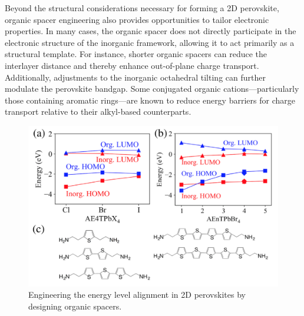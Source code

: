 Beyond the structural considerations necessary for forming a 2D perovskite, organic spacer engineering also provides opportunities to tailor electronic properties. In many cases, the organic spacer does not directly participate in the electronic structure of the inorganic framework, allowing it to act primarily as a structural template. For instance, shorter organic spacers can reduce the interlayer distance and thereby enhance out-of-plane charge transport\cite{RN179}. Additionally, adjustments to the inorganic octahedral tilting can further modulate the perovskite bandgap\cite{RN31}. Some conjugated organic cations—particularly those containing aromatic rings—are known to reduce energy barriers for charge transport relative to their alkyl-based counterparts\cite{RN239,RN88}.

\begin{figure}[ht]
    \centering
    \includegraphics[width=\textwidth]{figures/literature-review/figure2-15.png}
    \caption{Engineering the energy level alignment in 2D perovskites by designing organic spacers\cite{RN18}.}
    \label{fig:figure2.15}
\end{figure}

